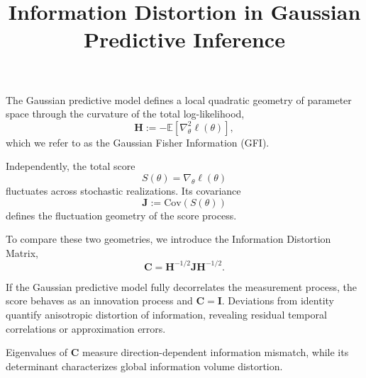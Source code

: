\documentclass[11pt]{article}
\title{Information Distortion in Gaussian Predictive Inference}
\author{}
\date{}
\begin{document}
\maketitle

The Gaussian predictive model defines a local quadratic geometry of parameter space through the curvature of the total log-likelihood,
\begin{equation}
\mathbf H := -\mathbb{E}\!\left[\nabla^2_\theta \ell(\theta)\right],
\end{equation}
which we refer to as the Gaussian Fisher Information (GFI).

Independently, the total score
\begin{equation}
S(\theta) = \nabla_\theta \ell(\theta)
\end{equation}
fluctuates across stochastic realizations. Its covariance
\begin{equation}
\mathbf J := \mathrm{Cov}(S(\theta))
\end{equation}
defines the fluctuation geometry of the score process.

To compare these two geometries, we introduce the Information Distortion Matrix,
\begin{equation}
\mathbf C = \mathbf H^{-1/2} \mathbf J \mathbf H^{-1/2}.
\end{equation}

If the Gaussian predictive model fully decorrelates the measurement process,
the score behaves as an innovation process and $\mathbf C = \mathbf I$.
Deviations from identity quantify anisotropic distortion of information,
revealing residual temporal correlations or approximation errors.

Eigenvalues of $\mathbf C$ measure direction-dependent information mismatch,
while its determinant characterizes global information volume distortion.
\end{document}
